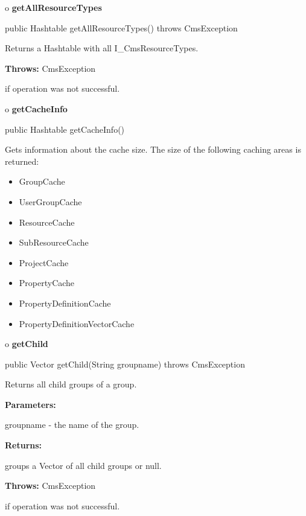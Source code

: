 o {\bf getAllResourceTypes}

\begin{PRE}
 public Hashtable getAllResourceTypes() throws CmsException
\end{PRE}

\begin{description}
\htmlDD Returns a Hashtable with all I\_CmsResourceTypes.

\begin{description}
\item {\bf Throws:} CmsException

if operation was not successful.
\end{description}

\end{description}

o {\bf getCacheInfo}

\begin{PRE}
 public Hashtable getCacheInfo()
\end{PRE}

\begin{description}
\htmlDD Gets information about the cache size. \htmlBR
The size of the following caching areas is returned:

\begin{itemize}
\item GroupCache
\item UserGroupCache
\item ResourceCache
\item SubResourceCache
\item ProjectCache
\item PropertyCache
\item PropertyDefinitionCache
\item PropertyDefinitionVectorCache
\end{itemize}

\end{description}

o {\bf getChild}

\begin{PRE}
 public Vector getChild(String groupname) throws CmsException
\end{PRE}

\begin{description}
\htmlDD Returns all child groups of a group.

\begin{description}
\item {\bf Parameters:}

groupname - the name of the group.
\item {\bf Returns:}

groups a Vector of all child groups or null.
\item {\bf Throws:} CmsException

if operation was not successful.
\end{description}

\end{description}

